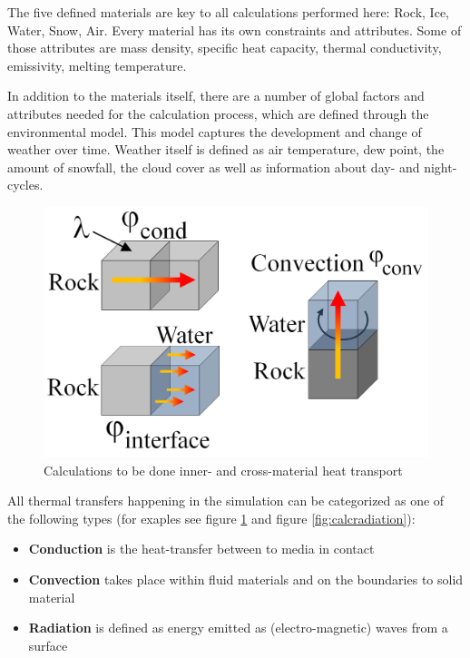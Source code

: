 The five defined materials are key to all calculations performed here: Rock, Ice, Water, Snow, Air. Every material has its own constraints and attributes. Some of those attributes are mass density, specific heat capacity, thermal conductivity, emissivity, melting temperature.

In addition to the materials itself, there are a number of global factors and attributes needed for the calculation process, which are defined through the environmental model. This model captures the development and change of weather over time. Weather itself is defined as air temperature, dew point, the amount of snowfall, the cloud cover as well as information about day- and night-cycles.

\begin{figure}[htb]
	\centering
	\includegraphics[width=\linewidth]{BF01/sem_heat_merged1.png}
	\caption{Calculations to be done inner- and cross-material heat transport}
	\label{fig:calcheattransport}
\end{figure}

All thermal transfers happening in the simulation can be categorized as one of the following types (for exaples see figure \ref{fig:calcheattransport} and figure \ref{fig:calcradiation}):
\begin{itemize}
	\item \textbf{Conduction} is the heat-transfer between to media in contact
	\item \textbf{Convection} takes place within fluid materials and on the boundaries to solid material
	\item \textbf{Radiation} is defined as energy emitted as (electro-magnetic) waves from a surface
\end{itemize}


